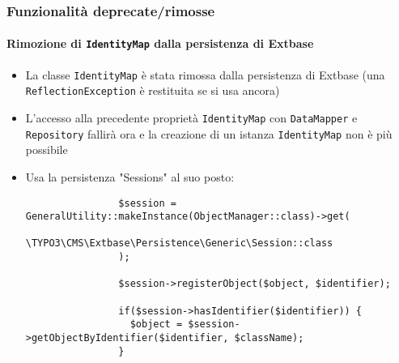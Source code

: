 \begin{frame}[fragile]
	\frametitle{Funzionalità deprecate/rimosse}
	\framesubtitle{Rimozione di \texttt{IdentityMap} dalla persistenza di Extbase}

	\lstset{basicstyle=\tiny\ttfamily}

	\begin{itemize}

		\item La classe \texttt{IdentityMap} è stata rimossa dalla persistenza di Extbase\newline
			\small(una \texttt{ReflectionException} è restituita se si usa ancora)\normalsize

		\item L'accesso alla precedente proprietà \texttt{IdentityMap} con
			\texttt{DataMapper} e \texttt{Repository} fallirà ora e la creazione
			di un istanza \texttt{IdentityMap} non è più possibile

		\item Usa la persistenza "Sessions" al suo posto:

			\begin{lstlisting}
				$session = GeneralUtility::makeInstance(ObjectManager::class)->get(
				  \TYPO3\CMS\Extbase\Persistence\Generic\Session::class
				);

				$session->registerObject($object, $identifier);

				if($session->hasIdentifier($identifier)) {
				  $object = $session->getObjectByIdentifier($identifier, $className);
				}
			\end{lstlisting}

	\end{itemize}

\end{frame}


